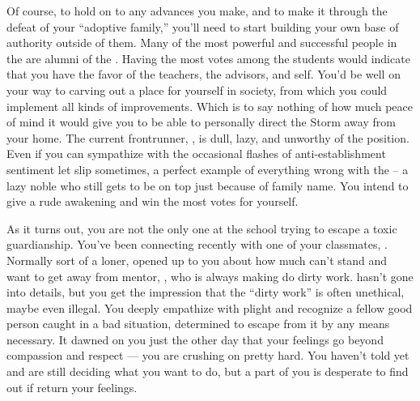 \documentclass[char]{GL2020}
\begin{document}
Of course, to hold on to any advances you make, and to make it through the defeat of your ``adoptive family,'' you'll need to start building your own base of authority outside of them. Many of the most powerful and successful people in the \pFarm{} are alumni of the \pSchool{}. Having the most votes among the \pFarmers{} students would indicate that you have the favor of the teachers, the advisors, and \cFarmGod{} \cFarmGod{\them}self. You'd be well on your way to carving out a place for yourself in \pFarm{} society, from which you could implement all kinds of improvements. Which is to say nothing of how much peace of mind it would give you to be able to personally direct the Storm away from your home. The current frontrunner, \cChupStudent{}, is dull, lazy, and unworthy of the position. Even if you can sympathize with the occasional flashes of anti-establishment sentiment \cChupStudent{\they} let\cChupStudent{\plural} slip sometimes, \cChupStudent{\they}\cChupStudent{\re} a perfect example of everything wrong with the \pFarm{} -- a lazy noble who still gets to be on top just because of \cChupStudent{\their} family name. You intend to give \cChupStudent{\them} a rude awakening and win the most votes for yourself.

As it turns out, you are not the only one at the school trying to escape a toxic guardianship. You've been connecting recently with one of your classmates, \cScholarship{\full}. Normally sort of a loner, \cScholarship{\they} \cScholarship{\have} opened up to you about how much \cScholarship{\they} can't stand and want\cScholarship{\plural} to get away from \cScholarship{\their} \cAntiChup{\cleric} mentor, \cAntiChup{\full}, who is always making \cScholarship{} do \cAntiChup{\their} dirty work. \cScholarship{} hasn't gone into details, but you get the impression that the ``dirty work'' is often unethical, maybe even illegal. You deeply empathize with \cScholarship{\their} plight and recognize a fellow good person caught in a bad situation, determined to escape from it by any means necessary. It dawned on you just the other day that your feelings go beyond compassion and respect — you are crushing on \cScholarship{\them} pretty hard. You haven't told  \cScholarship{} yet and are still deciding what you want to do, but a part of you is desperate to find out if \cScholarship{\they} return your feelings.
\end{document}
